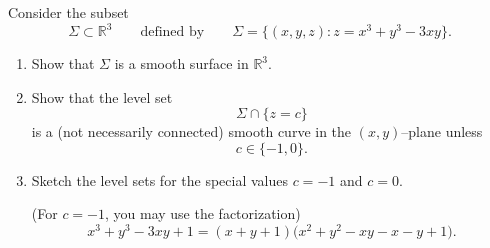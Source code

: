 \begin{problem}
\label{prob:cp-vii-0025}
Consider the subset
	\[
	\Sigma \subset \mathbb{R}^3
	\qquad\text{defined by}\qquad
	\Sigma = \{(x,y,z) : z = x^3 + y^3 - 3xy\}.
	\]
	
	\begin{enumerate}[label=\textnormal{(\alph*)}]
		
		\item
		Show that $\Sigma$ is a smooth surface in $\mathbb{R}^3$.
		
		\item
		Show that the level set
		\[
		\Sigma \cap \{z=c\}
		\]
		is a (not necessarily connected) smooth curve in the $(x,y)$--plane
		unless
		\[
		c \in \{-1,0\}.
		\]
		
		\item
		Sketch the level sets for the special values $c=-1$ and $c=0$.
		
		(For $c=-1$, you may use the factorization)
		\[
		x^3 + y^3 - 3xy + 1
		= (x+y+1)\bigl(x^2 + y^2 - xy - x - y + 1\bigr).
		\]
		
	\end{enumerate}
\end{problem}

